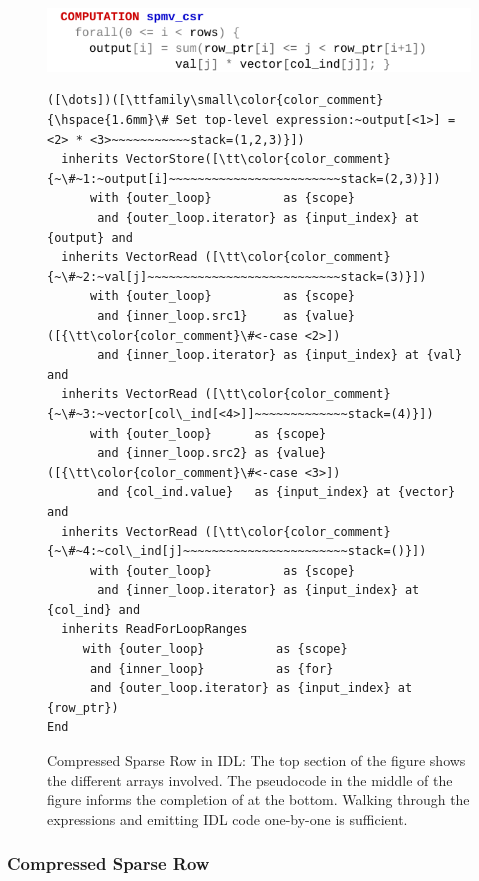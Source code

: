 \begin{figure}[p]
\includegraphics[width=\linewidth]{figures/spmvcsrwhat.pdf}
\vspace{-1.5em}
\begin{lstlisting}[language=IDL,firstnumber=7]
([\dots])([\ttfamily\small\color{color_comment}{\hspace{1.6mm}\# Set top-level expression:~output[<1>] = <2> * <3>~~~~~~~~~~~stack=(1,2,3)}])
  inherits VectorStore([\tt\color{color_comment}{~\#~1:~output[i]~~~~~~~~~~~~~~~~~~~~~~~~stack=(2,3)}])
      with {outer_loop}          as {scope}
       and {outer_loop.iterator} as {input_index} at {output} and
  inherits VectorRead ([\tt\color{color_comment}{~\#~2:~val[j]~~~~~~~~~~~~~~~~~~~~~~~~~~~stack=(3)}])
      with {outer_loop}          as {scope}
       and {inner_loop.src1}     as {value}([{\tt\color{color_comment}\#<-case <2>])
       and {inner_loop.iterator} as {input_index} at {val} and
  inherits VectorRead ([\tt\color{color_comment}{~\#~3:~vector[col\_ind[<4>]]~~~~~~~~~~~~~stack=(4)}])
      with {outer_loop}      as {scope}
       and {inner_loop.src2} as {value}([{\tt\color{color_comment}\#<-case <3>])
       and {col_ind.value}   as {input_index} at {vector} and
  inherits VectorRead ([\tt\color{color_comment}{~\#~4:~col\_ind[j]~~~~~~~~~~~~~~~~~~~~~~~stack=()}])
      with {outer_loop}          as {scope}
       and {inner_loop.iterator} as {input_index} at {col_ind} and
  inherits ReadForLoopRanges
     with {outer_loop}          as {scope}
      and {inner_loop}          as {for}
      and {outer_loop.iterator} as {input_index} at {row_ptr})
End
\end{lstlisting}
\caption{Compressed Sparse Row in IDL:
         The top section of the figure shows the different arrays involved.
         The pseudocode in the middle of the figure informs the completion of
         at the bottom.
         Walking through the expressions and emitting IDL code one-by-one is
         sufficient.}
\label{csr_lilacwhat_fig}
\end{figure}

\subsubsection{Compressed Sparse Row}

